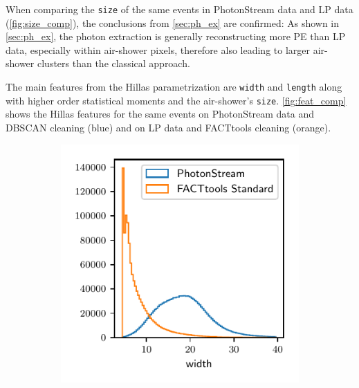 %
When comparing the \texttt{size} of the same events in PhotonStream data and LP data (\autoref{fig:size_comp}),
the conclusions from \autoref{sec:ph_ex} are confirmed: As shown in
\autoref{sec:ph_ex}, the photon extraction is generally reconstructing more PE
than LP data, especially within air-shower pixels, therefore also leading to
larger air-shower clusters than the classical approach.

The main features from the Hillas parametrization are \texttt{width} and
\texttt{length} along with higher order statistical moments and the
air-shower's \texttt{size}. \autoref{fig:feat_comp} shows the Hillas features for the same events on PhotonStream data and DBSCAN cleaning (blue) and on LP data and FACTtools cleaning (orange).
%
\begin{figure}
  \begin{subfigure}{0.5\textwidth}
    \centering
    \includegraphics[width=\textwidth, page=1]{Plots/std_phs_comparison_hist_same_DBSCAN_crab.pdf}
  \end{subfigure}
  \begin{subfigure}{0.5\textwidth}
    \centering

\end{subfigure}
\end{figure}
